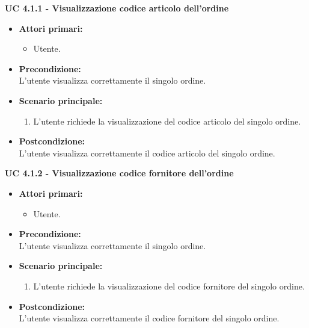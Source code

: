 \vspace{0.4cm}

\noindent \textbf{\large UC 4.1.1 - Visualizzazione codice articolo dell'ordine}
\label{uc:visualizzazione-codice-articolo}
\begin{itemize}

	\item \textbf{Attori primari: }
		\begin{itemize}
			\item Utente.
		\end{itemize}

	\item \textbf{Precondizione: }\\[0.3cm]
		L'utente visualizza correttamente il singolo ordine.

	\item \textbf{Scenario principale: }
		\begin{enumerate}
			\item L'utente richiede la visualizzazione del codice articolo del singolo ordine.
		\end{enumerate}
		

	\item \textbf{Postcondizione: }\\[0.3cm]
		L'utente visualizza correttamente il codice articolo del singolo ordine.

\end{itemize}

\vspace{0.4cm}

\noindent \textbf{\large UC 4.1.2 - Visualizzazione codice fornitore dell'ordine}
\label{uc:visualizzazione-codice-fornitore}
\begin{itemize}

	\item \textbf{Attori primari: }
		\begin{itemize}
			\item Utente.
		\end{itemize}

	\item \textbf{Precondizione: }\\[0.3cm]
		L'utente visualizza correttamente il singolo ordine.

	\item \textbf{Scenario principale: }
		\begin{enumerate}
			\item L'utente richiede la visualizzazione del codice fornitore del singolo ordine.
		\end{enumerate}
		

	\item \textbf{Postcondizione: }\\[0.3cm]
		L'utente visualizza correttamente il codice fornitore del singolo ordine.

\end{itemize}

